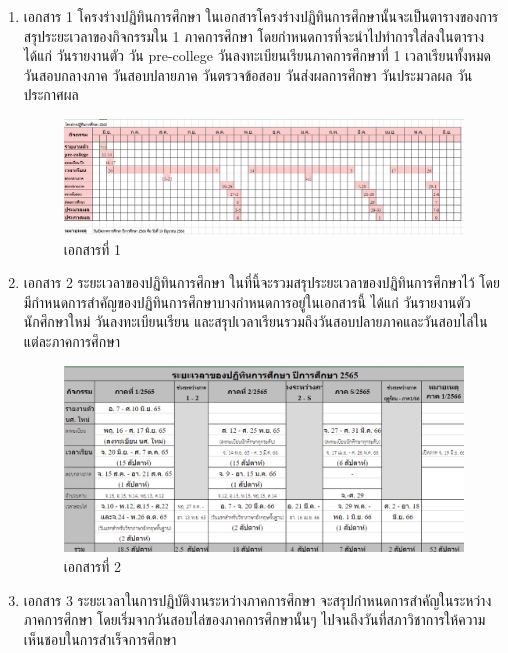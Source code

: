\begin{enumerate}
    \item เอกสาร 1 โครงร่างปฏิทินการศึกษา ในเอกสารโครงร่างปฏิทินการศึกษานั้นจะเป็นตารางของการสรุประยะเวลาของกิจกรรมใน 1 ภาคการศึกษา
          โดยกำหนดการที่จะนำไปทำการใส่ลงในตารางได้แก่ วันรายงานตัว วัน pre-college วันลงทะเบียนเรียนภาคการศึกษาที่ 1 เวลาเรียนทั้งหมด วันสอบกลางภาค วันสอบปลายภาค วันตรวจข้อสอบ วันส่งผลการศึกษา วันประมวลผล วันประกาศผล \enskip
          \begin{figure}[h]
              \centering
              \includegraphics[width=1\textwidth]{draft-calendar.png}
              \caption{เอกสารที่ 1}
              \label{fig:academic-draft}
          \end{figure}
    \item เอกสาร 2 ระยะเวลาของปฏิทินการศึกษา ในที่นี้จะรวมสรุประยะเวลาของปฏิทินการศึกษาไว้ โดยมีกำหนดการสำคัญของปฏิทินการศึกษาบางกำหนดการอยู่ในเอกสารนี้ ได้แก่ วันรายงานตัวนักศึกษาใหม่ วันลงทะเบียนเรียน และสรุปเวลาเรียนรวมถึงวันสอบปลายภาคและวันสอบไล่ในแต่ละภาคการศึกษา \enskip
          \begin{figure}[h]
              \centering
              \includegraphics[width=1\textwidth]{duration-calendar.png}
              \caption{เอกสารที่ 2}
              \label{fig: duration-calendar}
          \end{figure}
    \item เอกสาร 3 ระยะเวลาในการปฏิบัติงานระหว่างภาคการศึกษา จะสรุปกำหนดการสำคัญในระหว่างภาคการศึกษา โดยเริ่มจากวันสอบไล่ของภาคการศึกษานั้นๆ ไปจนถึงวันที่สภาวิชาการให้ความเห็นชอบในการสำเร็จการศึกษา \enskip

\end{enumerate}
